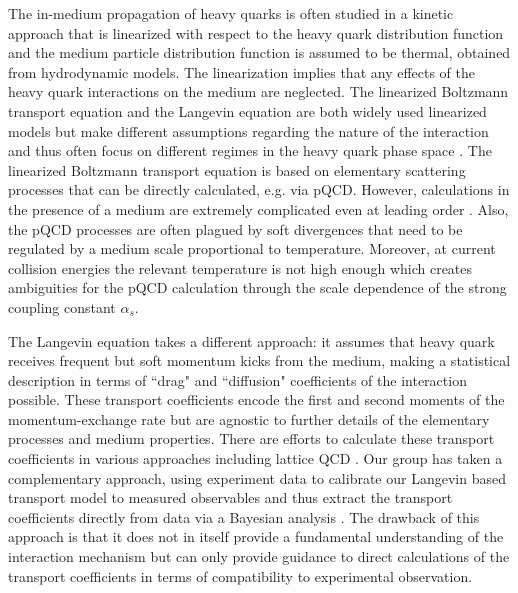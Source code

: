 \documentclass[aps, prc, reprint, amsmath, groupedaddress, nofootinbib]{revtex4-1}
\begin{document}
The in-medium propagation of heavy quarks is often studied in a kinetic approach that is linearized with respect to the heavy quark distribution function and the medium particle distribution function is assumed to be thermal, obtained from hydrodynamic models.
The linearization implies that any effects of the heavy quark interactions on the medium are neglected.
The linearized Boltzmann transport equation and the Langevin equation are both widely used linearized models but make different assumptions regarding the nature of the interaction and thus often focus on different regimes in the heavy quark phase space \cite{Auvinen:2009qm,Cao:2016gvr, Cao:2017hhk, PhysRevD.37.2484, Moore:2004tg}.
The linearized Boltzmann transport equation is based on elementary scattering processes that can be directly calculated, e.g. via pQCD.
However, calculations in the presence of a medium are extremely complicated even at leading order \cite{Arnold:2002zm}.
Also, the pQCD processes are often plagued by soft divergences that need to be regulated by a medium scale proportional to temperature. Moreover, at current collision energies the relevant temperature is not high enough which creates ambiguities for the pQCD calculation through the scale dependence of the strong coupling constant $\alpha_s$.

The Langevin equation takes a different approach: 
it assumes that heavy quark receives frequent but soft momentum kicks from the medium, making a statistical description in terms of ``drag" and ``diffusion" coefficients of the interaction possible.
These transport coefficients encode the first and second moments of the momentum-exchange rate but are agnostic to further details of the elementary processes and medium properties.
There are efforts to calculate these transport coefficients in various approaches including lattice QCD \cite{Moore:2004tg,CaronHuot:2008uh, Gossiaux:2008jv,He:2012df,Riek:2010fk,vanHees:2007me,Scardina:2017ipo,Ding:2012sp,Banerjee:2011ra}. Our group has taken a complementary approach, using experiment data to calibrate our Langevin based transport model to measured observables and thus extract the transport coefficients directly from data via a Bayesian analysis \cite{Xu:2017obm}. The drawback of this approach is that it does not in itself provide a fundamental understanding of the interaction mechanism but can only provide guidance to direct calculations of the transport coefficients in terms of compatibility to experimental observation.
\end{document}
